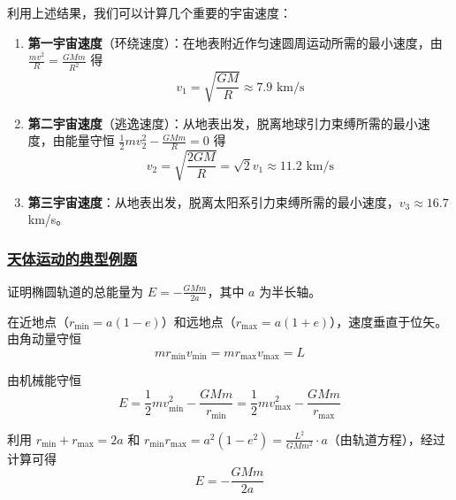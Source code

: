 利用上述结果，我们可以计算几个重要的宇宙速度：

\begin{enumerate}
    \item \textbf{第一宇宙速度}（环绕速度）：在地表附近作匀速圆周运动所需的最小速度，由 $\displaystyle \frac{mv^2}{R} = \frac{GMm}{R^2}$ 得
    \begin{equation}
        v_1 = \sqrt{\frac{GM}{R}} \approx 7.9 \text{ km/s}
    \end{equation}
    \item \textbf{第二宇宙速度}（逃逸速度）：从地表出发，脱离地球引力束缚所需的最小速度，由能量守恒 $\displaystyle \frac{1}{2}mv_2^2 - \frac{GMm}{R} = 0$ 得
    \begin{equation}
        v_2 = \sqrt{\frac{2GM}{R}} = \sqrt{2}v_1 \approx 11.2 \text{ km/s}
    \end{equation}
    \item \textbf{第三宇宙速度}：从地表出发，脱离太阳系引力束缚所需的最小速度，$v_3 \approx 16.7$ km/s。
\end{enumerate}

\subsubsection{\protect\hyperlink{:}{天体运动的典型例题}}

\begin{example}[椭圆轨道的能量]
    证明椭圆轨道的总能量为 $E = -\frac{GMm}{2a}$，其中 $a$ 为半长轴。
    \begin{solution}
        在近地点（$r_{\min} = a(1-e)$）和远地点（$r_{\max} = a(1+e)$），速度垂直于位矢。由角动量守恒
        \begin{equation}
            mr_{\min}v_{\min} = mr_{\max}v_{\max} = L
        \end{equation}
        
        由机械能守恒
        \begin{equation}
            E = \frac{1}{2}mv_{\min}^2 - \frac{GMm}{r_{\min}} = \frac{1}{2}mv_{\max}^2 - \frac{GMm}{r_{\max}}
        \end{equation}
        
        利用 $r_{\min} + r_{\max} = 2a$ 和 $r_{\min}r_{\max} = a^2(1-e^2) = \frac{L^2}{GMm^2} \cdot a$（由轨道方程），经过计算可得
        \begin{equation}
            E = -\frac{GMm}{2a}
        \end{equation}
    \end{solution}
\end{example}

